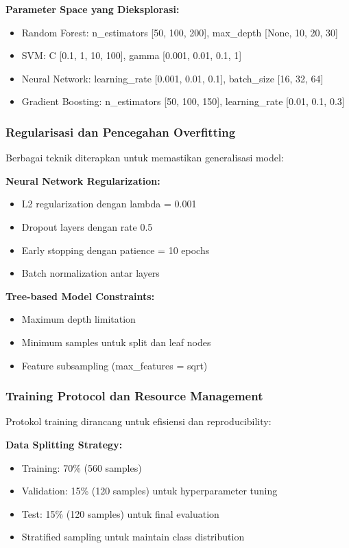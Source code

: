 \textbf{Parameter Space yang Dieksplorasi:}
\begin{itemize}
    \item Random Forest: n\_estimators [50, 100, 200], max\_depth [None, 10, 20, 30]
    \item SVM: C [0.1, 1, 10, 100], gamma [0.001, 0.01, 0.1, 1]
    \item Neural Network: learning\_rate [0.001, 0.01, 0.1], batch\_size [16, 32, 64]
    \item Gradient Boosting: n\_estimators [50, 100, 150], learning\_rate [0.01, 0.1, 0.3]
\end{itemize}

\subsubsection{Regularisasi dan Pencegahan Overfitting}
\label{sec:regularisasi}

Berbagai teknik diterapkan untuk memastikan generalisasi model:

\textbf{Neural Network Regularization:}
\begin{itemize}
    \item L2 regularization dengan lambda = 0.001
    \item Dropout layers dengan rate 0.5
    \item Early stopping dengan patience = 10 epochs
    \item Batch normalization antar layers
\end{itemize}

\textbf{Tree-based Model Constraints:}
\begin{itemize}
    \item Maximum depth limitation
    \item Minimum samples untuk split dan leaf nodes
    \item Feature subsampling (max\_features = sqrt)
\end{itemize}

\subsubsection{Training Protocol dan Resource Management}
\label{sec:trainingProtocol}

Protokol training dirancang untuk efisiensi dan reproducibility:

\textbf{Data Splitting Strategy:}
\begin{itemize}
    \item Training: 70\% (560 samples)
    \item Validation: 15\% (120 samples) untuk hyperparameter tuning
    \item Test: 15\% (120 samples) untuk final evaluation
    \item Stratified sampling untuk maintain class distribution
\end{itemize}

